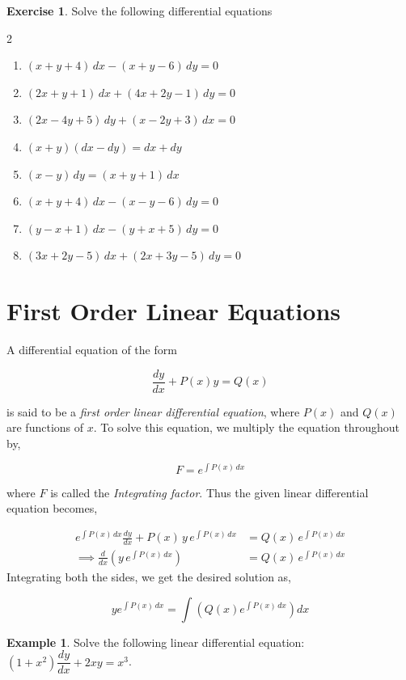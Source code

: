 \documentclass{book}
\theoremstyle{definition}
\newtheorem{exercise}{Exercise}[section]
\newtheorem{example}{Example}[section]
\begin{document}
\begin{exercise}
Solve the following differential equations
\begin{multicols}{2}
\begin{enumerate}[label=(\roman*)]
    \item $(x+y+4)\,dx-(x+y-6)\,dy=0$
    \item $(2x+y+1)\,dx+(4x+2y-1)\,dy=0$
    \item $(2x-4y+5)\,dy+(x-2y+3)\,dx=0$
    \item $(x+y)(dx-dy)=dx+dy$
    \item $(x-y)\,dy=(x+y+1)\,dx$
    \item $(x+y+4)\,dx-(x-y-6)\,dy=0$
    \item $(y-x+1)\,dx-(y+x+5)\,dy=0$
    \item $(3x+2y-5)\,dx+(2x+3y-5)\,dy=0$

\end{enumerate}
\end{multicols}
\end{exercise}

\section{First Order Linear Equations}

A differential equation of the form 

\[
\frac{dy}{dx}+P(x)y=Q(x)
\]


is said to be a \textit{first order linear differential equation}, where $P(x)$ and $Q(x)$ are functions of $x$. To solve this equation, we multiply the equation throughout by,

\[
F=e^{\int P(x)\,dx}
\]


where $F$ is called the \textit{Integrating factor}. Thus the given linear differential equation becomes,

\begin{align*}
    e^{\int P(x)\,dx}\frac{dy}{dx} + P(x)\,y\,e^{\int P(x)\,dx} &= Q(x)\,e^{\int P(x)\,dx} \\[6pt]
    \implies \frac{d}{dx}\left(y\,e^{\int P(x)\,dx}\right) &= Q(x)\,e^{\int P(x)\,dx}
\end{align*}
Integrating both the sides, we get the desired solution as,

\[
ye^{\int P(x)\,dx}=\int (Q(x)e^{\int P(x)\,dx})dx
\]

\begin{example}
Solve the following linear differential equation: $(1+x^2)\dfrac{dy}{dx}+2xy=x^3$.
\end{example}
\end{document}
